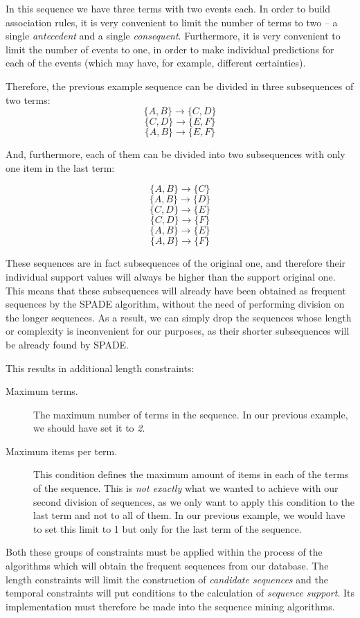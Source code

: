 In this sequence we have three terms with two events each. In order to build association rules, it is very convenient to limit the number of terms to two -- a single \emph{antecedent} and a single \emph{consequent}. Furthermore, it is very convenient to limit the number of events to one, in order to make individual predictions for each of the events (which may have, for example, different certainties). 

Therefore, the previous example sequence can be divided in three subsequences of two terms:
$$\{A, B\} \longrightarrow \{C, D\}$$
$$\{C, D\} \longrightarrow \{E, F\}$$
$$\{A, B\} \longrightarrow \{E, F\}$$

And, furthermore, each of them can be divided into two subsequences with only one item in the last term:

$$\{A, B\} \longrightarrow \{C\}$$
$$\{A, B\} \longrightarrow \{D\}$$
$$\{C, D\} \longrightarrow \{E\}$$
$$\{C, D\} \longrightarrow \{F\}$$
$$\{A, B\} \longrightarrow \{E\}$$
$$\{A, B\} \longrightarrow \{F\}$$

These sequences are in fact subsequences of the original one, and therefore their individual support values will always be higher than the support original one. This means that these subsequences will already have been obtained as frequent sequences by the SPADE algorithm, without the need of performing division on the longer sequences. As a result, we can simply drop the sequences whose length or complexity is inconvenient for our purposes, as their shorter subsequences will be already found by SPADE.

This results in additional length constraints:
\begin{description}
\item[Maximum terms.] The maximum number of terms in the sequence. In our previous example, we should have set it to \emph{2}.
\item[Maximum items per term.] This condition defines the maximum amount of items in each of the terms of the sequence. This is \emph{not exactly} what we wanted to achieve with our second division of sequences, as we only want to apply this condition to the last term and not to all of them. In our previous example, we would have to set this limit to 1 but only for the last term of the sequence.
\end{description}

Both these groups of constraints must be applied within the process of the algorithms which will obtain the frequent sequences from our database. The length constraints will limit the construction of \emph{candidate sequences} and the temporal constraints will put conditions to the calculation of \emph{sequence support}. Its implementation must therefore be made into the sequence mining algorithms.

